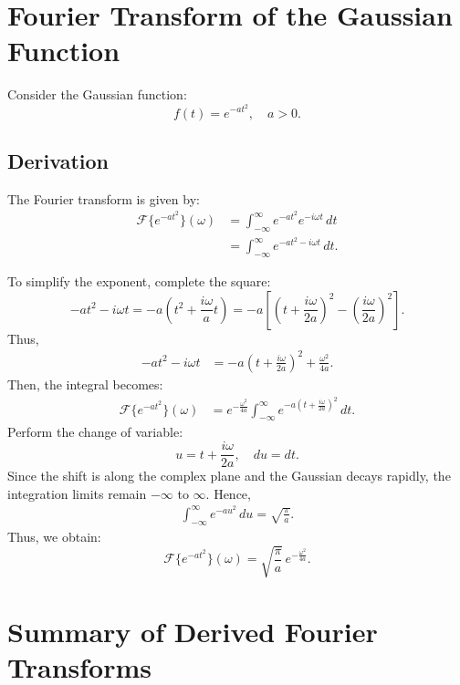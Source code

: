 \documentclass[11pt]{article}
\begin{document}
\newpage

\section{Fourier Transform of the Gaussian Function}

Consider the Gaussian function:
\begin{equation}
    f(t) = e^{-at^2}, \quad a>0.
\end{equation}

\subsection*{Derivation}
The Fourier transform is given by:
\begin{align}
    \mathcal{F}\{e^{-at^2}\}(\omega) &= \int_{-\infty}^{\infty} e^{-at^2}e^{-i\omega t}\, dt \\
    &= \int_{-\infty}^{\infty} e^{-at^2 - i\omega t}\, dt.
\end{align}

To simplify the exponent, complete the square:
\[
-at^2 - i\omega t = -a\left(t^2 + \frac{i\omega}{a}t\right)
= -a\left[\left(t + \frac{i\omega}{2a}\right)^2 - \left(\frac{i\omega}{2a}\right)^2\right].
\]
Thus,
\begin{align}
    -at^2 - i\omega t &= -a\left(t + \frac{i\omega}{2a}\right)^2 + \frac{\omega^2}{4a}.
\end{align}
Then, the integral becomes:
\begin{align}
    \mathcal{F}\{e^{-at^2}\}(\omega)
    &= e^{-\frac{\omega^2}{4a}} \int_{-\infty}^{\infty} e^{-a\left(t+\frac{i\omega}{2a}\right)^2}\, dt.
\end{align}
Perform the change of variable:
\[
u = t + \frac{i\omega}{2a}, \quad du = dt.
\]
Since the shift is along the complex plane and the Gaussian decays rapidly, the integration limits remain \(-\infty\) to \(\infty\). Hence,
\begin{align}
    \int_{-\infty}^{\infty} e^{-a u^2}\, du = \sqrt{\frac{\pi}{a}}.
\end{align}
Thus, we obtain:
\begin{equation}
    \boxed{\mathcal{F}\{e^{-at^2}\}(\omega) = \sqrt{\frac{\pi}{a}}\, e^{-\frac{\omega^2}{4a}}.}
\end{equation}

\newpage

\section{Summary of Derived Fourier Transforms}
\end{document}
